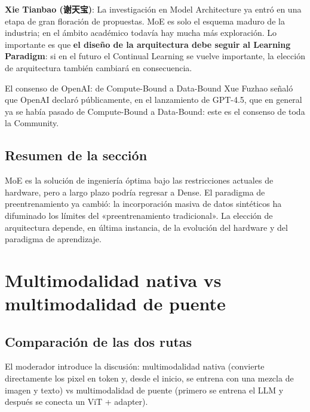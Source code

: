 \documentclass[a4paper]{article}
\begin{document}
\textbf{Xie Tianbao (谢天宝)}: La investigación en Model Architecture ya entró en una etapa de gran floración de propuestas. MoE es solo el esquema maduro de la industria; en el ámbito académico todavía hay mucha más exploración. Lo importante es que \textbf{el diseño de la arquitectura debe seguir al Learning Paradigm}: si en el futuro el Continual Learning se vuelve importante, la elección de arquitectura también cambiará en consecuencia.

\begin{warningbox}{El consenso de OpenAI: de Compute-Bound a Data-Bound}
Xue Fuzhao señaló que OpenAI declaró públicamente, en el lanzamiento de GPT-4.5, que en general ya se había pasado de Compute-Bound a Data-Bound: este es el consenso de toda la Community.
\end{warningbox}

\subsection{Resumen de la sección}
MoE es la solución de ingeniería óptima bajo las restricciones actuales de hardware, pero a largo plazo podría regresar a Dense. El paradigma de preentrenamiento ya cambió: la incorporación masiva de datos sintéticos ha difuminado los límites del «preentrenamiento tradicional». La elección de arquitectura depende, en última instancia, de la evolución del hardware y del paradigma de aprendizaje.

\section{Multimodalidad nativa vs multimodalidad de puente}

\subsection{Comparación de las dos rutas}

El moderador introduce la discusión: multimodalidad nativa (convierte directamente los pixel en token y, desde el inicio, se entrena con una mezcla de imagen y texto) vs multimodalidad de puente (primero se entrena el LLM y después se conecta un ViT + adapter).
\end{document}
